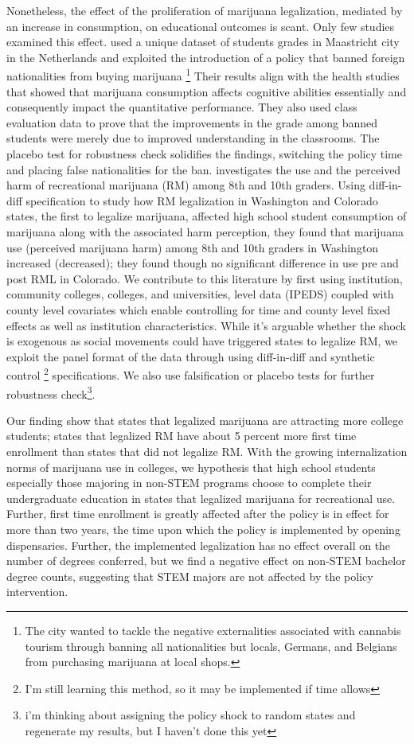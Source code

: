 \documentclass[12pt]{article}%
\begin{document}
Nonetheless, the effect of the proliferation of marijuana  legalization, mediated by an increase in consumption, on educational outcomes  is scant. Only few studies examined this effect. \citet{marie2017high} used a unique dataset of students grades in Maastricht city in the Netherlands and exploited the introduction of a policy that banned foreign nationalities from buying marijuana 
\footnote{The city wanted to tackle the negative externalities associated with cannabis tourism through banning all nationalities but locals, Germans, and Belgians from purchasing marijuana at local shops.} 
Their results align with the health studies that showed that marijuana consumption affects cognitive abilities essentially and consequently impact the quantitative
performance. They also used class evaluation data to prove that the improvements in the grade among banned students were merely due to improved understanding in the classrooms. The
placebo test for robustness check solidifies the findings, switching the policy time and placing false nationalities for the ban. 
\cite{cerda2017association}  investigates the use and the perceived harm of recreational marijuana (RM) among 8th and 10th graders. Using diff-in-diff specification to study how RM legalization in Washington and Colorado states, the first to legalize marijuana, affected high school student consumption of marijuana along with the associated harm perception, they found that marijuana use (perceived marijuana harm) among 8th and 10th graders in Washington increased (decreased); they found though no significant difference in use pre and post RML in Colorado. We contribute to this literature by first using institution, community colleges, colleges, and universities, level data (IPEDS) coupled with county level covariates which enable controlling for time and county level fixed effects as well as institution characteristics. While it's arguable whether the shock is exogenous as social movements could have triggered states to legalize RM, we exploit the panel format of the data through using diff-in-diff and synthetic control \footnote{I'm still learning this method, so it may be implemented if time allows} specifications. We also use falsification or placebo tests for further robustness check\footnote{i'm thinking about assigning the policy shock to random states and regenerate my results, but I haven't done this yet}.

Our finding show that states that legalized marijuana are attracting more college students; states that legalized RM have about 5 percent more first time enrollment than states that did not legalize RM. With the growing internalization norms of marijuana use in colleges, we hypothesis that high school students especially those majoring in non-STEM programs choose to complete their undergraduate education in states that legalized marijuana for recreational use. Further, first time enrollment is greatly affected after the policy is in effect for more than two years, the time upon which the policy is implemented by opening dispensaries. Further, the implemented legalization has no effect overall on the number of degrees conferred, but we find a negative effect on non-STEM bachelor degree counts, suggesting that STEM majors are not affected by the policy intervention. 
\end{document}
